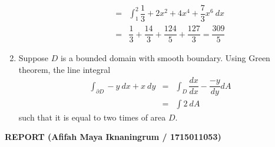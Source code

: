 \documentclass[a4paper,10pt]{article}
\begin{document}
\begin{enumerate}
\begin{itemize}
\begin{eqnarray}
		&=& \int_{1}^{2} \dfrac{1}{3} + 2x^2 + 4x^4 +\dfrac{7}{3}x^6 \ dx \\ \nonumber
		&=& \dfrac{1}{3} + \dfrac{14}{3} + \dfrac{124}{5} + \dfrac{127}{3} = \dfrac{309}{5}
		\end{eqnarray}
	\end{itemize}
	\item Suppose $ D $ is a bounded domain with smooth boundary. Using Green theorem, the line integral 
	\begin{eqnarray} \nonumber
	\int_{\partial D} -y \ dx + x \ dy &=& \int_{D} \dfrac{dx}{dx} - \dfrac{-y}{dy} dA \\ \nonumber
	&=& \int 2 \ dA
	\end{eqnarray}
	such that it is equal to two times of area $ D $.

\end{enumerate}

\newpage
\textbf{REPORT (Afifah Maya Iknaningrum / 1715011053)}\\ \\
\end{document}
